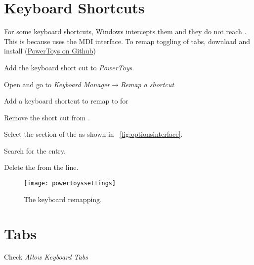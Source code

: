 \section{Keyboard Shortcuts}
For some keyboard shortcuts, Windows intercepts them and they do not reach \winedt{}.  This is because \winedt{} uses the MDI interface.  To remap toggling of tabs, download and install \powertoys{} (\href{https://github.com/microsoft/PowerToys}{PowerToys on Github})
\begin{outline}
	\item Add the keyboard short cut to \emph{PowerToys}.
	\begin{outline}
		\item Open  and go to \emph{Keyboard Manager}$\rightarrow$\emph{Remap a shortcut}
		\item Add a keyboard shortcut to remap  to  for \winedt{}
	\end{outline}
	\item Remove the short cut from \winedt{}.
	\begin{outline}
		\item Select the  section of the  as shown in \figurename~\ref{fig:optionsinterface}.
		\item Search for the  entry.
		\item Delete the  from the  line.
	\end{outline}
\end{outline}
\begin{figure}
	\centering
	\texttt{[image: powertoyssettings]}
	\caption[The \powertoys{} keyboard remapping]{The \powertoys{} keyboard remapping.}
	\label{fig:powertoyssettings}
\end{figure}

\section{Tabs}
   \begin{numberedlist}
   	\item {}
   	\item Check \textit{Allow Keyboard Tabs}
   \end{numberedlist}

